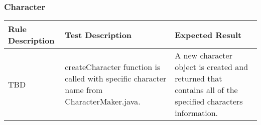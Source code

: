 \subsubsection{Character}
\begin{center}
\begin{supertabular}{|p{4.5cm}|p{4.5cm}|p{4.5cm}|}
\hline
    \textbf{Rule Description}
    &
    \textbf{Test Description}
    &
    \textbf{Expected Result}
\\\hline
    TBD
    &
    createCharacter function is called with 
    specific character name from CharacterMaker.java.
    &
    A new character object is created and returned 
    that contains all of the specified characters information. 
\\\hline    
\end{supertabular}
\end{center}
